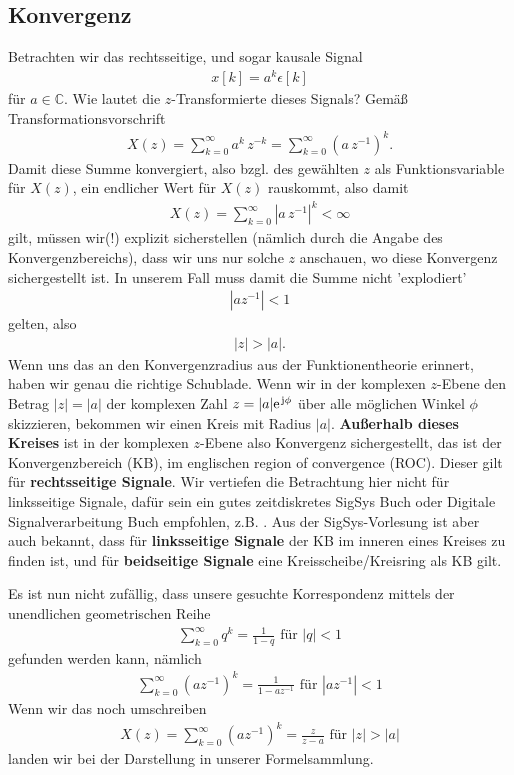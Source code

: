 \subsection*{Konvergenz}
Betrachten wir das rechtsseitige, und sogar kausale Signal
\begin{align}
x[k] = a^k \epsilon[k]
\end{align}
für $a\in\mathbb{C}$.
%
Wie lautet die $z$-Transformierte dieses Signals? Gemäß Transformationsvorschrift
\begin{align}
X(z) = \sum_{k=0}^{\infty} a^k \, z^{-k} = \sum_{k=0}^{\infty} (a \, z^{-1})^k.
\end{align}
Damit diese Summe konvergiert, also bzgl. des gewählten $z$ als Funktionsvariable für $X(z)$,
ein endlicher Wert für $X(z)$ rauskommt, also damit
\begin{align}
X(z) = \sum_{k=0}^{\infty} |a \, z^{-1}|^k < \infty
\end{align}
gilt, müssen wir(!) explizit sicherstellen (nämlich durch die Angabe des
Konvergenzbereichs), dass wir uns nur solche $z$ anschauen, wo diese Konvergenz
sichergestellt ist. In unserem Fall muss damit die Summe nicht 'explodiert'
\begin{align}
|a z^{-1}| < 1
\end{align}
gelten, also
\begin{align}
|z| > |a|.
\end{align}
%
Wenn uns das an den Konvergenzradius aus der Funktionentheorie erinnert,
haben wir genau die richtige Schublade.
%
Wenn wir in der komplexen $z$-Ebene den Betrag $|z|=|a|$
der komplexen Zahl $z = |a| \e^{\im\phi}$ über alle möglichen Winkel $\phi$
skizzieren, bekommen wir einen Kreis mit Radius $|a|$.
\textbf{Außerhalb dieses Kreises}
ist in der komplexen $z$-Ebene also Konvergenz sichergestellt, das ist der Konvergenzbereich (KB), im englischen region of convergence (ROC).
Dieser gilt für \textbf{rechtsseitige Signale}. Wir vertiefen die Betrachtung
hier nicht für linksseitige Signale, dafür sein ein gutes zeitdiskretes SigSys Buch oder Digitale Signalverarbeitung Buch
empfohlen, z.B. \cite{Oppenheim2004,Oppenheim2010,Kammeyer2002,Holton21}.
%
Aus der SigSys-Vorlesung ist aber auch bekannt, dass für \textbf{linksseitige Signale}
der KB im inneren eines Kreises zu finden ist, und für \textbf{beidseitige Signale}
eine Kreisscheibe/Kreisring als KB gilt.

Es ist nun nicht zufällig, dass unsere gesuchte
Korrespondenz mittels der unendlichen geometrischen Reihe
\begin{align}
\label{eq:ex_09_geo_reihe}
\sum_{k=0}^\infty q^k = \frac{1}{1-q}\text{ für }|q|<1
\end{align}
gefunden werden kann, nämlich
\begin{align}
\sum_{k=0}^\infty (a z^{-1})^k = \frac{1}{1-a z^{-1}}\text{ für }|a z^{-1}|<1
\end{align}
Wenn wir das noch umschreiben
\begin{align}
X(z) = \sum_{k=0}^\infty (a z^{-1})^k = \frac{z}{z-a}\text{ für } |z|>|a|
\end{align}
landen wir bei der Darstellung in unserer Formelsammlung.
%

